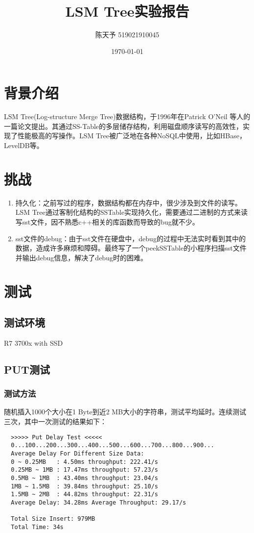 \documentclass{ctexart}
\title{LSM Tree实验报告}
\author{陈天予 519021910045}
\date{\today}
\begin{document}
\maketitle

\section{背景介绍}
LSM Tree(Log-structure Merge Tree)数据结构，于1996年在Patrick O’Neil 等人的一篇论文提出。其通过SS-Table的多层储存结构，利用磁盘顺序读写的高效性，实现了性能极高的写操作。LSM Tree被广泛地在各种NoSQL中使用，比如HBase，LevelDB等。

\section{挑战}
\begin{enumerate}
  \item 持久化：之前写过的程序，数据结构都在内存中，很少涉及到文件的读写。LSM Tree通过客制化结构的SSTable实现持久化，需要通过二进制的方式来读写sst文件，因不熟悉c++相关的库函数而导致的bug就不少。
  \item sst文件的debug：由于sst文件在硬盘中，debug的过程中无法实时看到其中的数据，造成许多麻烦和障碍。最终写了一个peekSSTable的小程序扫描sst文件并输出debug信息，解决了debug时的困难。
\end{enumerate}

\section{测试}
\subsection{测试环境}
R7 3700x with SSD
\subsection{PUT测试}
\subsubsection{测试方法}
随机插入1000个大小在1 Byte到近2 MB大小的字符串，测试平均延时。连续测试三次，其中一次测试的结果如下：
\begin{verbatim}
  >>>>> Put Delay Test <<<<<
  0...100...200...300...400...500...600...700...800...900...
  Average Delay For Different Size Data: 
  0 ~ 0.25MB   : 4.50ms throughput: 222.41/s
  0.25MB ~ 1MB : 17.47ms throughput: 57.23/s
  0.5MB ~ 1MB  : 43.40ms throughput: 23.04/s
  1MB ~ 1.5MB  : 39.84ms throughput: 25.10/s
  1.5MB ~ 2MB  : 44.82ms throughput: 22.31/s
  Average Delay: 34.28ms Average Throughput: 29.17/s
  
  Total Size Insert: 979MB
  Total Time: 34s
\end{verbatim}
\end{document}
